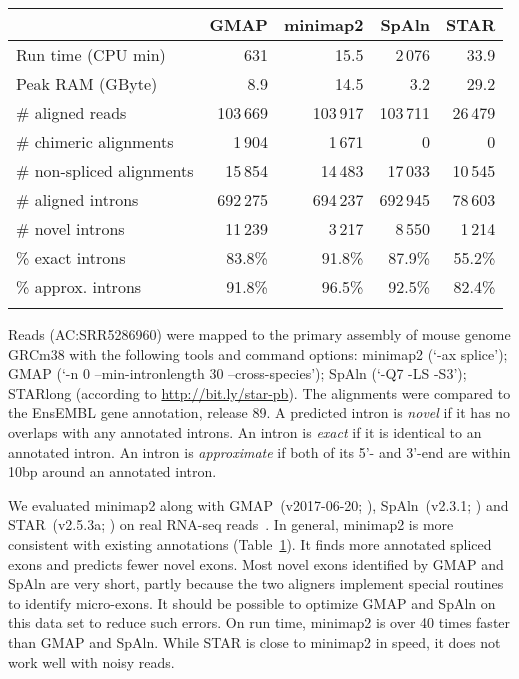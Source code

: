 \documentclass{bioinfo}
\begin{document}
\begin{table}[!tb]
{\footnotesize\label{tab:exon}
\begin{tabular}{p{3.1cm}rrrr}
\toprule
& GMAP & minimap2 & SpAln & STAR\\
\midrule
Run time (CPU min) & 631 & 15.5 & 2\,076 & 33.9 \\
Peak RAM (GByte) & 8.9 & 14.5 & 3.2 & 29.2\vspace{1em}\\
\# aligned reads & 103\,669 & 103\,917 & 103\,711 & 26\,479\\
\# chimeric alignments & 1\,904 & 1\,671 & 0 & 0\\
\# non-spliced alignments & 15\,854 & 14\,483 & 17\,033 & 10\,545\vspace{1em}\\
\# aligned introns & 692\,275 & 694\,237 & 692\,945 & 78\,603 \\
\# novel introns & 11\,239 & 3\,217 & 8\,550 & 1\,214 \\
\% exact introns & 83.8\% & 91.8\% & 87.9\% & 55.2\% \\
\% approx. introns & 91.8\% & 96.5\% & 92.5\% & 82.4\% \\
\botrule
\end{tabular}
}{Reads (AC:SRR5286960) were mapped to the primary assembly of mouse genome
GRCm38 with the following tools and command options: minimap2 (`-ax splice');
GMAP (`-n 0 --min-intronlength 30 --cross-species'); SpAln (`-Q7 -LS -S3');
STARlong (according to
\href{http://bit.ly/star-pb}{http://bit.ly/star-pb}). The alignments were
compared to the EnsEMBL gene annotation, release 89. A predicted intron
is \emph{novel} if it has no overlaps with any annotated introns. An intron
is \emph{exact} if it is identical to an annotated intron. An intron is
\emph{approximate} if both of its 5'- and 3'-end are within 10bp around an
annotated intron.}
\end{table}

We evaluated minimap2 along with GMAP~(v2017-06-20; \citealp{Wu:2005vn}),
SpAln~(v2.3.1; \citealp{Iwata:2012aa}) and STAR~(v2.5.3a;
\citealp{Dobin:2013kx}) on real RNA-seq reads~\citep{Byrne:2017aa}.
In general, minimap2 is more consistent with existing annotations
(Table~\ref{tab:exon}). It finds more annotated spliced exons and predicts
fewer novel exons. Most novel exons identified by GMAP and SpAln are
very short, partly because the two aligners implement special routines to
identify micro-exons. It should be possible to optimize GMAP and SpAln on this
data set to reduce such errors. On run time, minimap2 is over 40 times faster
than GMAP and SpAln. While STAR is close to minimap2 in speed, it does not work
well with noisy reads.
\end{document}
